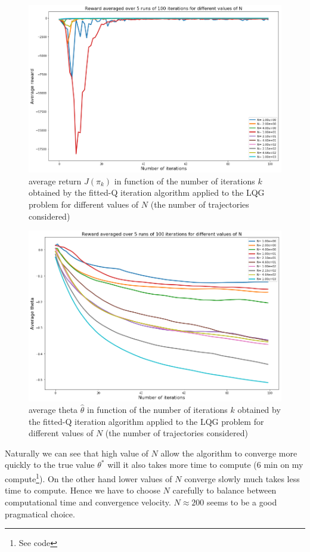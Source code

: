 \documentclass[11pt]{article}
\numberwithin{figure}{section} %
\begin{document}
\begin{figure}[H]
		\centering
		\includegraphics[width=0.8\linewidth]{images/q2_reward}
		\caption{average return $J(\pi_k)$ in function of the number of iterations $k$ obtained by the fitted-Q iteration algorithm applied to the LQG problem for different values of $N$ (the number of trajectories considered)}
		\label{fig:q2_reward}
\end{figure}

\begin{figure}[H]
		\centering
		\includegraphics[width=0.8\linewidth]{images/q2_theta}
		\caption{average theta $\widehat{\theta}$ in function of the number of iterations $k$ obtained by the fitted-Q iteration algorithm applied to the LQG problem for different values of $N$ (the number of trajectories considered)}
		\label{fig:q2_theta}
\end{figure}

Naturally we can see that high value of $N$ allow the algorithm to converge more quickly to the true value $\theta^*$ will it also takes more time to compute (6 min on my compute\footnote{See code}). On the other hand lower values of $N$ converge slowly much takes less time to compute. Hence we have to choose $N$ carefully to balance between computational time and convergence velocity. $N \approx 200$ seems to be a good pragmatical choice.
\end{document}
